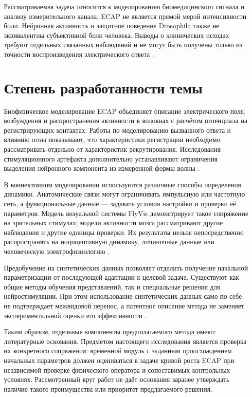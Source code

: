 Рассматриваемая задача относится к моделированию биомедицинского сигнала и анализу измерительного канала. ECAP не является прямой мерой интенсивности боли. Нейронная активность и защитное поведение Drosophila также не эквивалентны субъективной боли человека. Выводы о клинических исходах требуют отдельных связанных наблюдений и не могут быть получены только из точности воспроизведения электрического ответа \cite{s781,s780,s901}.

\section*{Степень разработанности темы}
Биофизическое моделирование ECAP объединяет описание электрического поля, возбуждения и распространения активности в волокнах с расчётом потенциала на регистрирующих контактах. Работы по моделированию вызванного ответа и влиянию позы показывают, что характеристики регистрации необходимо рассматривать отдельно от характеристик рекрутирования. Исследования стимуляционного артефакта дополнительно устанавливают ограничения выделения нейронного компонента из измеренной формы волны \cite{ecapmodel,posture,s159,s798}.

В коннектомном моделировании используются различные способы определения динамики. Анатомические связи могут ограничивать импульсную или частотную сеть, а функциональные данные --- задавать условия настройки и проверки её параметров. Модель визуальной системы FlyVis демонстрирует такое сопряжение на зрительных стимулах; модели активности мозга рассматривают другие наблюдения и другие единицы проверки. Их результаты нельзя непосредственно распространять на ноцицептивную динамику, личиночные данные или человеческую электрофизиологию \cite{s744,s743,s775}.

Предобучение на синтетических данных позволяет отделить получение начальной параметризации от последующей адаптации к целевой задаче. Существуют как общие методы обучения представлений, так и специальные решения для нейростимуляции. При этом использование синтетических данных само по себе не подтверждает межвидовой перенос, а патентное описание метода не заменяет экспериментальной оценки его эффективности \cite{s286,s149,s746}.

Таким образом, отдельные компоненты предполагаемого метода имеют литературные основания. Предметом настоящего исследования является проверка их конкретного сопряжения: временной модуль с заданным происхождением начальных параметров должен оцениваться в задаче кривой роста ECAP при независимой проверке физического оператора и сопоставимых контрольных условиях. Рассмотренный круг работ не даёт основания заранее утверждать наличие такого преимущества или приоритет предлагаемого решения.

